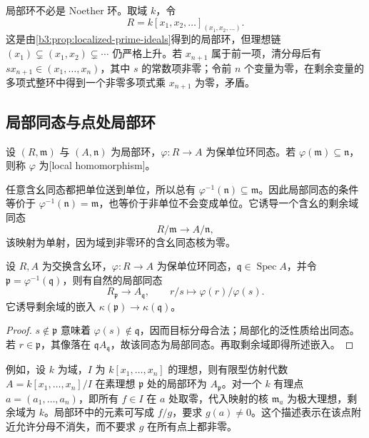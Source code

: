 局部环不必是 Noether 环。取域 \(k\)，令
\[
	R=k[x_1,x_2,\ldots]_{(x_1,x_2,\ldots)}.
\]
这是由\cref{b3:prop:localized-prime-ideals}得到的局部环，但理想链 \((x_1)\subsetneq(x_1,x_2)\subsetneq\cdots\) 仍严格上升。若 \(x_{n+1}\) 属于前一项，清分母后有 \(s x_{n+1}\in(x_1,\ldots,x_n)\)，其中 \(s\) 的常数项非零；令前 \(n\) 个变量为零，在剩余变量的多项式整环中得到一个非零多项式乘 \(x_{n+1}\) 为零，矛盾。

\subsection{局部同态与点处局部环}
\label{b3:subsec:0205:02}

\begin{definition}\label{b3:def:local-homomorphism}
	设 \((R,\mathfrak m)\) 与 \((A,\mathfrak n)\) 为局部环，\(\varphi:R\to A\) 为保单位环同态。若 \(\varphi(\mathfrak m)\subseteq\mathfrak n\)，则称 \(\varphi\) 为[local homomorphism]。
\end{definition}

任意含幺同态都把单位送到单位，所以总有 \(\varphi^{-1}(\mathfrak n)\subseteq\mathfrak m\)。因此局部同态的条件等价于 \(\varphi^{-1}(\mathfrak n)=\mathfrak m\)，也等价于非单位不会变成单位。它诱导一个含幺的剩余域同态
\[
	R/\mathfrak m\longrightarrow A/\mathfrak n,
\]
该映射为单射，因为域到非零环的含幺同态核为零。

\begin{proposition}\label{b3:prop:induced-local-map}
	设 \(R,A\) 为交换含幺环，\(\varphi:R\rightarrow A\) 为保单位环同态，\(\mathfrak q\in\operatorname{Spec}A\)，并令 \(\mathfrak p=\varphi^{-1}(\mathfrak q)\)，则有自然的局部同态
	\[
		R_{\mathfrak p}\longrightarrow A_{\mathfrak q}, \qquad r/s\longmapsto\varphi(r)/\varphi(s).
	\]
	它诱导剩余域的嵌入 \(\kappa(\mathfrak p)\rightarrow\kappa(\mathfrak q)\)。
\end{proposition}
\begin{proof}
	\(s\notin\mathfrak p\) 意味着 \(\varphi(s)\notin\mathfrak q\)，因而目标分母合法；局部化的泛性质给出同态。若 \(r\in\mathfrak p\)，其像落在 \(\mathfrak qA_{\mathfrak q}\)，故该同态为局部同态。再取剩余域即得所述嵌入。
\end{proof}

例如，设 \(k\) 为域，\(I\) 为 \(k[x_1,\ldots,x_n]\) 的理想，则有限型仿射代数 \(A=k[x_1,\ldots,x_n]/I\) 在素理想 \(\mathfrak p\) 处的局部环为 \(A_{\mathfrak p}\)。对一个 \(k\) 有理点 \(a=(a_1,\ldots,a_n)\)，即所有 \(f\in I\) 在 \(a\) 处取零，代入映射的核 \(\mathfrak m_a\) 为极大理想，剩余域为 \(k\)。局部环中的元素可写成 \(f/g\)，要求 \(g(a)\ne0\)。这个描述表示在该点附近允许分母不消失，而不要求 \(g\) 在所有点上都非零。

